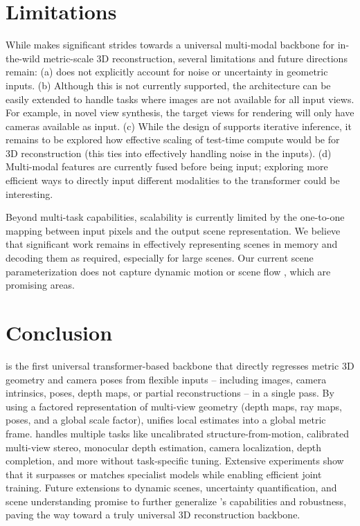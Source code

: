 \section{Limitations}
\label{sec:limitations}

While \coolname makes significant strides towards a universal multi-modal backbone for in-the-wild metric-scale 3D reconstruction, several limitations and future directions remain:
(a) \coolname does not explicitly account for noise or uncertainty in geometric inputs.
(b) Although this is not currently supported, the architecture can be easily extended to handle tasks where images are not available for all input views. For example, in novel view synthesis, the target views for rendering will only have cameras available as input.
(c) While the design of \coolname supports iterative inference, it remains to be explored how effective scaling of test-time compute would be for 3D reconstruction (this ties into effectively handling noise in the inputs).
(d) Multi-modal features are currently fused before being input; exploring more efficient ways to directly input different modalities to the transformer could be interesting.

Beyond multi-task capabilities, scalability is currently limited by the one-to-one mapping between input pixels and the output scene representation.
We believe that significant work remains in effectively representing scenes in memory and decoding them as required, especially for large scenes.
Our current scene parameterization does not capture dynamic motion or scene flow \cite{karhade2025any4d}, which are promising areas.


\section{Conclusion}
\label{sec:conclusion}

\coolname is the first universal transformer-based backbone that directly regresses metric 3D geometry and camera poses from flexible inputs -- including images, camera intrinsics, poses, depth maps, or partial reconstructions -- in a single pass. 
By using a factored representation of multi-view geometry (depth maps, ray maps, poses, and a global scale factor), \coolname unifies local estimates into a global metric frame.
\coolname handles multiple tasks like uncalibrated structure-from-motion, calibrated multi-view stereo, monocular depth estimation, camera localization, depth completion, and more without task-specific tuning.
Extensive experiments show that it surpasses or matches specialist models while enabling efficient joint training. 
Future extensions to dynamic scenes, uncertainty quantification, and scene understanding promise to further generalize \coolname's capabilities and robustness, paving the way toward a truly universal 3D reconstruction backbone.
